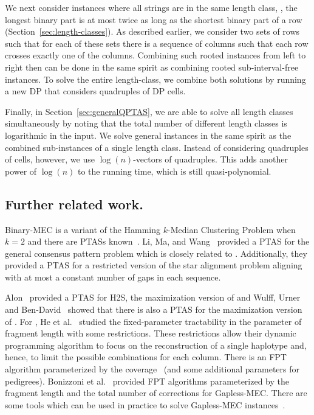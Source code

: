 We next consider \GMEC instances where all strings are in the same length class, \ie, the longest binary part is at most twice as long as the shortest binary part of a row (Section~\ref{sec:length-classes}).
As described earlier, we consider two sets of rows such that for each of these sets there is a sequence of columns such that each row crosses exactly one of the columns.
Combining such rooted instances from left to right then can be done in the same spirit as combining rooted sub-interval-free instances.
To solve the entire length-class, we combine both solutions by running a new DP that considers quadruples of DP cells.

Finally, in Section~\ref{sec:generalQPTAS}, we are able to solve all length classes simultaneously by noting that the total number of different length classes is logarithmic in the input.
We solve general instances in the same spirit as the combined sub-instances of a single length class.
Instead of considering quadruples of cells, however, we use $\log(n)$-vectors of quadruples.
This adds another power of $\log(n)$ to the running time, which is still quasi-polynomial.

\subsection{Further related work.}
Binary-MEC is a variant of the Hamming $k$-Median Clustering Problem when $k = 2$ and there are PTASs known~\cite{JXL04_k, OR02_polynomial}. 
Li, Ma, and Wang~\cite{LMW02_finding} provided a PTAS for the general consensus pattern problem which is closely related to \MEC.
Additionally, they provided a PTAS for a restricted version of the star alignment problem aligning with at most a constant number of gaps in each sequence.

Alon~\cite{AS99_two} provided a PTAS for H2S, the maximization version of \BMEC and Wulff, Urner and Ben-David~\cite{WUB13_monochromatic} showed that there is also a PTAS for the maximization version of \MEC.
For \GMEC, He et al.~\cite{HCP+10_optimal} studied the fixed-parameter tractability in the parameter of fragment length with some restrictions.
These restrictions allow their dynamic programming algorithm to focus on the reconstruction of a single haplotype and, hence, to limit the possible combinations for each column.
There is an FPT algorithm parameterized by the coverage~\cite{PMP+15_whatshap,garg2016read} (and some additional parameters for pedigrees). 
Bonizzoni et al.~\cite{BDK+16_minimum} provided FPT algorithms parameterized by the fragment length and the total number of corrections for Gapless-MEC.
There are some tools which can be used in practice to solve Gapless-MEC instances~\cite{PZD+15_hapcol, PMP+15_whatshap}.

